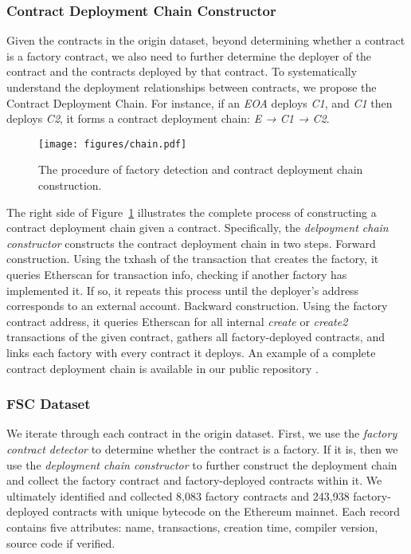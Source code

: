 \documentclass[acmsmall,screen]{acmart}
\begin{document}
	\subsubsection{Contract Deployment Chain Constructor}\label{sec:deployment}
	Given the contracts in the origin dataset, beyond determining whether a contract is a factory contract, we also need to further determine the deployer of the contract and the contracts deployed by that contract. To systematically understand the deployment relationships between contracts, we propose the Contract Deployment Chain. For instance, if an \textit{EOA} deploys \textit{C1}, and \textit{C1} then deploys \textit{C2}, it forms a contract deployment chain: \textit{E → C1 → C2}.

	\begin{figure}[t]
		\centering
		\texttt{[image: figures/chain.pdf]}
		\caption{The procedure of factory detection and contract deployment chain construction.}
		\label{fig:chain}
	\end{figure}

	The right side of Figure~\ref{fig:chain} illustrates the complete process of constructing a contract deployment chain given a contract. Specifically, the \textit{delpoyment chain constructor} constructs the contract deployment chain in two steps.  Forward construction. Using the txhash of the transaction that creates the factory, it queries Etherscan for transaction info, checking if another factory has implemented it. If so, it repeats this process until the deployer's address corresponds to an external account.
	 Backward construction. Using the factory contract address, it queries Etherscan for all internal \textit{create} or \textit{create2} transactions of the given contract, gathers all factory-deployed contracts, and links each factory with every contract it deploys. An example of a complete contract deployment chain is available in our public repository \cite{fscdata}.


	\subsubsection{FSC Dataset} We iterate through each contract in the origin dataset. First, we use the \textit{factory contract detector} to determine whether the contract is a factory. If it is, then we use the \textit{deployment chain constructor} to further construct the deployment chain and collect the factory contract and factory-deployed contracts within it. We ultimately identified and collected 8,083 factory contracts and 243,938 factory-deployed contracts with unique bytecode on the Ethereum mainnet. Each record contains five attributes:  name,  transactions,  creation time,  compiler version,  source code if verified.
\end{document}
